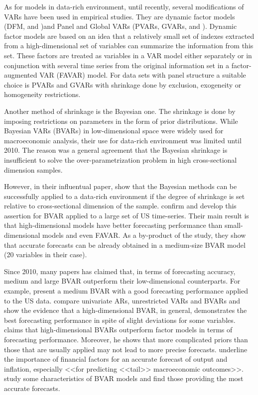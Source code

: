 \documentclass[11pt]{article} %
\begin{document}
As for models in data-rich environment, until recently, several modifications of VARs have been used in empirical studies. They are dynamic factor models (DFM, \cite{forni_al_2000} and \cite{stock_watson_2002})and Panel and Global VARs (PVARs, GVARs, \cite{pesaran_al_2004} and \cite{dees_guntner_2014}).  Dynamic factor models are based on an idea that a relatively small set of indexes extracted from a high-dimensional set of variables can summarize the information from this set.
These factors are treated as variables in a VAR model either separately or in conjunction with several time series from the original information set in a factor-augmented VAR (FAVAR) model. For data sets with panel structure a suitable choice is PVARs and GVARs with shrinkage done by exclusion, exogeneity or homogeneity restrictions.

Another method of shrinkage is the Bayesian one. The shrinkage is done by imposing restrictions on parameters in the form of prior distributions.  While Bayesian VARs (BVARs) in low-dimensional space were widely used for macroeconomic analysis, their use for data-rich environment was limited until 2010. The reason was a general agreement that the Bayesian shrinkage is insufficient to solve the over-parametrization problem in high cross-sectional dimension samples.

However, in their influentual paper,  \cite{demol_al_2008} show that  the Bayesian methods can be successfully applied to a data-rich environment if the degree of shrinkage is set relative to cross-sectional dimension of the sample. \cite{banbura_al_2010} confirm and develop this assertion for BVAR applied to a large set of US time-series. Their main result is that high-dimensional models have better forecasting performance than small-dimensional models and even FAVAR. As a  by-product of the study, they show that accurate forecasts can be already obtained in a medium-size BVAR model (20 variables in their case).

Since 2010, many papers has claimed that, in terms of forecasting accuracy, medium and large BVAR outperform their low-dimensional counterparts. For example,  \cite{beauchemin_zaman_2011} present a medium BVAR with a good forecasting performance applied to the US data.  \cite{bloor_matheson_2010} compare univariate ARs, unrestricted VARs and BVARs and show the evidence that  a high-dimensional BVAR, in general, demonstrates the best forecasting performance in spite of slight deviations for some variables. \cite{koop_2013} claims that  high-dimensional BVARs outperform factor models in terms of forecasting performance. Moreover, he shows that more complicated priors than those that are usually applied may not lead to more precise forecasts. \cite{alessandri_mumtaz_2014} underline the importance of financial factors for an accurate forecast of output and inflation, especially <<for predicting <<tail>> macroeconomic outcomes>>.
\cite{carriero_al_2015} study some characteristics of  BVAR models and find those providing the most accurate forecasts.
\end{document}
